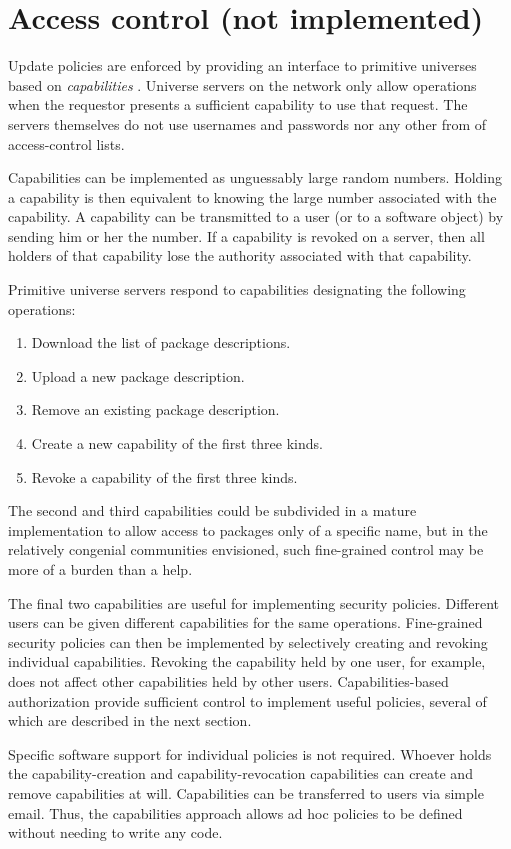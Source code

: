 \documentclass{article}
\begin{document}
\section{Access control (not implemented)}
Update policies are enforced by providing an interface to primitive
universes based on \emph{capabilities} \cite{miller00:caps}.  Universe
servers on the network only allow operations when the requestor
presents a sufficient capability to use that request.  The servers
themselves do not use usernames and passwords nor any other from of
access-control lists.

Capabilities can be implemented as unguessably large random numbers.
Holding a capability is then equivalent to knowing the large number
associated with the capability.  A capability can be transmitted to a
user (or to a software object) by sending him or her the number.  If a
capability is revoked on a server, then all holders of that capability
lose the authority associated with that capability.


Primitive universe servers respond to capabilities designating the
following operations:
\begin{enumerate}
\item Download the list of package descriptions.
\item Upload a new package description.
\item Remove an existing package description.
\item Create a new capability of the first three kinds.
\item Revoke a capability of the first three kinds.
\end{enumerate}
The second and third capabilities could be subdivided in a mature
implementation to allow access to packages only of a specific name,
but in the relatively congenial communities envisioned, such
fine-grained control may be more of a burden than a help.


The final two capabilities are useful for implementing security
policies.  Different users can be given different capabilities for the
same operations.  Fine-grained security policies can then be implemented by
selectively creating and revoking individual capabilities.  Revoking
the capability held by one user, for example, does not affect other
capabilities held by other users.
Capabilities-based authorization provide sufficient control to
implement useful policies, several of which are described in the next
section.


Specific software support for individual policies is not required.
Whoever holds the capability-creation and capability-revocation
capabilities can create and remove capabilities at will.  Capabilities
can be transferred to users via simple email.  Thus, the capabilities
approach allows ad hoc policies to be defined without needing to write
any code.
\end{document}
